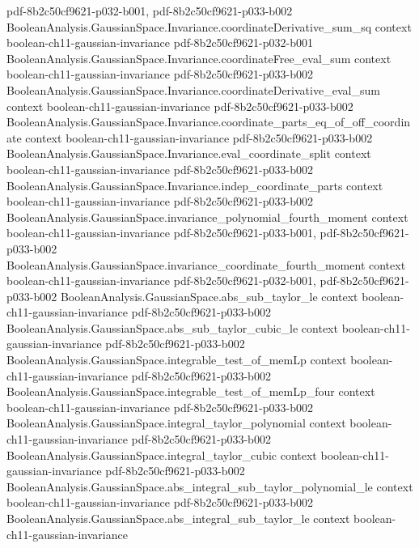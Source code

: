 \begin{theorem}
  {pdf-8b2c50cf9621-p032-b001,
    pdf-8b2c50cf9621-p033-b002}
\proofstep
  {BooleanAnalysis.GaussianSpace.Invariance.coordinateDerivative_sum_sq}
  {context}
  {boolean-ch11-gaussian-invariance}
  {pdf-8b2c50cf9621-p032-b001}
\proofstep
  {BooleanAnalysis.GaussianSpace.Invariance.coordinateFree_eval_sum}
  {context}
  {boolean-ch11-gaussian-invariance}
  {pdf-8b2c50cf9621-p033-b002}
\proofstep
  {BooleanAnalysis.GaussianSpace.Invariance.coordinateDerivative_eval_sum}
  {context}
  {boolean-ch11-gaussian-invariance}
  {pdf-8b2c50cf9621-p033-b002}
\proofstep
  {BooleanAnalysis.GaussianSpace.Invariance.coordinate_parts_eq_of_off_coordinate}
  {context}
  {boolean-ch11-gaussian-invariance}
  {pdf-8b2c50cf9621-p033-b002}
\proofstep
  {BooleanAnalysis.GaussianSpace.Invariance.eval_coordinate_split}
  {context}
  {boolean-ch11-gaussian-invariance}
  {pdf-8b2c50cf9621-p033-b002}
\proofstep
  {BooleanAnalysis.GaussianSpace.Invariance.indep_coordinate_parts}
  {context}
  {boolean-ch11-gaussian-invariance}
  {pdf-8b2c50cf9621-p033-b002}
\proofstep
  {BooleanAnalysis.GaussianSpace.invariance_polynomial_fourth_moment}
  {context}
  {boolean-ch11-gaussian-invariance}
  {pdf-8b2c50cf9621-p033-b001,
    pdf-8b2c50cf9621-p033-b002}
\proofstep
  {BooleanAnalysis.GaussianSpace.invariance_coordinate_fourth_moment}
  {context}
  {boolean-ch11-gaussian-invariance}
  {pdf-8b2c50cf9621-p032-b001,
    pdf-8b2c50cf9621-p033-b002}
\proofstep
  {BooleanAnalysis.GaussianSpace.abs_sub_taylor_le}
  {context}
  {boolean-ch11-gaussian-invariance}
  {pdf-8b2c50cf9621-p033-b002}
\proofstep
  {BooleanAnalysis.GaussianSpace.abs_sub_taylor_cubic_le}
  {context}
  {boolean-ch11-gaussian-invariance}
  {pdf-8b2c50cf9621-p033-b002}
\proofstep
  {BooleanAnalysis.GaussianSpace.integrable_test_of_memLp}
  {context}
  {boolean-ch11-gaussian-invariance}
  {pdf-8b2c50cf9621-p033-b002}
\proofstep
  {BooleanAnalysis.GaussianSpace.integrable_test_of_memLp_four}
  {context}
  {boolean-ch11-gaussian-invariance}
  {pdf-8b2c50cf9621-p033-b002}
\proofstep
  {BooleanAnalysis.GaussianSpace.integral_taylor_polynomial}
  {context}
  {boolean-ch11-gaussian-invariance}
  {pdf-8b2c50cf9621-p033-b002}
\proofstep
  {BooleanAnalysis.GaussianSpace.integral_taylor_cubic}
  {context}
  {boolean-ch11-gaussian-invariance}
  {pdf-8b2c50cf9621-p033-b002}
\proofstep
  {BooleanAnalysis.GaussianSpace.abs_integral_sub_taylor_polynomial_le}
  {context}
  {boolean-ch11-gaussian-invariance}
  {pdf-8b2c50cf9621-p033-b002}
\proofstep
  {BooleanAnalysis.GaussianSpace.abs_integral_sub_taylor_le}
  {context}
  {boolean-ch11-gaussian-invariance}

\end{theorem}
